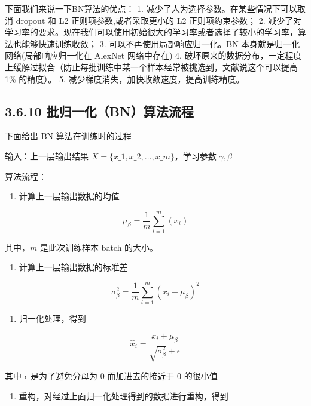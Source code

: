 下面我们来说一下BN算法的优点： 1.
减少了人为选择参数。在某些情况下可以取消 dropout 和 L2
正则项参数,或者采取更小的 L2 正则项约束参数； 2.
减少了对学习率的要求。现在我们可以使用初始很大的学习率或者选择了较小的学习率，算法也能够快速训练收敛；
3. 可以不再使用局部响应归一化。BN 本身就是归一化网络(局部响应归一化在
AlexNet 网络中存在) 4.
破坏原来的数据分布，一定程度上缓解过拟合（防止每批训练中某一个样本经常被挑选到，文献说这个可以提高
1\% 的精度）。 5. 减少梯度消失，加快收敛速度，提高训练精度。

\subsection{3.6.10
批归一化（BN）算法流程}\label{ux6279ux5f52ux4e00ux5316bnux7b97ux6cd5ux6d41ux7a0b}

下面给出 BN 算法在训练时的过程

输入：上一层输出结果 $ X = \{x\_1, x\_2, \ldots{}, x\_m\} $，学习参数
$ \gamma, \beta $

算法流程：

\begin{enumerate}
\def\labelenumi{\arabic{enumi}.}
 
\item
  计算上一层输出数据的均值
\end{enumerate}

\[
\mu_{\beta} = \frac{1}{m} \sum_{i=1}^m(x_i)
\]

其中，$ m $ 是此次训练样本 batch 的大小。

\begin{enumerate}
\def\labelenumi{\arabic{enumi}.}
\setcounter{enumi}{1}
 
\item
  计算上一层输出数据的标准差
\end{enumerate}

\[
\sigma_{\beta}^2 = \frac{1}{m} \sum_{i=1}^m (x_i - \mu_{\beta})^2
\]

\begin{enumerate}
\def\labelenumi{\arabic{enumi}.}
\setcounter{enumi}{2}
 
\item
  归一化处理，得到
\end{enumerate}

\[
\hat x_i = \frac{x_i + \mu_{\beta}}{\sqrt{\sigma_{\beta}^2} + \epsilon}
\]

其中 $ \epsilon $ 是为了避免分母为 0 而加进去的接近于 0 的很小值

\begin{enumerate}
\def\labelenumi{\arabic{enumi}.}
\setcounter{enumi}{3}
 
\item
  重构，对经过上面归一化处理得到的数据进行重构，得到
\end{enumerate}

